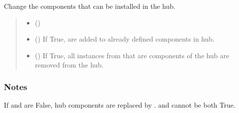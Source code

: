 \documentclass[letterpaper,10pt,english]{sphinxmanual}
\begin{document}
\begin{fulllineitems}
\begin{fulllineitems}
\label{\detokenize{generated/tamos.Hub:tamos.Hub.change_components}}
\pysigstartsignatures
{}
\pysigstopsignatures
\sphinxAtStartPar
Change the components that can be installed in the hub.
\begin{quote}\begin{description}
\begin{itemize}
\item {} 
\sphinxAtStartPar
{} (\sphinxstyleliteralemphasis{\sphinxupquote{, }}) \textendash{} 

\item {} 
\sphinxAtStartPar
{} (\sphinxstyleliteralemphasis{\sphinxupquote{, }}) \textendash{} If True,  are added to already defined components in hub.

\item {} 
\sphinxAtStartPar
{} (\sphinxstyleliteralemphasis{\sphinxupquote{, }}) \textendash{} If True, all instances from  that are components of the hub are removed from the hub.

\end{itemize}

\end{description}\end{quote}
\subsubsection*{Notes}

\sphinxAtStartPar
If  and  are False, hub components are replaced by .
 and  cannot be both True.


\end{fulllineitems}
\end{fulllineitems}
\end{document}
